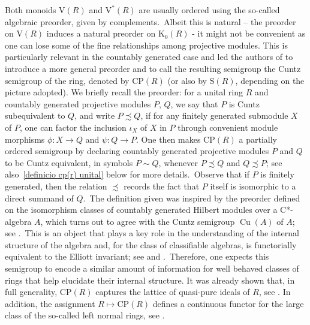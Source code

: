 \documentclass[11pt]{amsart}
\numberwithin{equation}{section}
\theoremstyle{definition}
\newcommand{\K}{\mathrm{K}}
\DeclareMathOperator{\Cu}{Cu}
\newcommand{\V}{\mathrm{V}}
\newcommand{\CP}{\mathrm{CP}}
\theoremstyle{plain}
\theoremstyle{definition}
\begin{document}
Both monoids $\V(R)$ and $\V^*(R)$ are usually ordered using the so-called algebraic preorder, given by complements.~Albeit this is natural -- the preorder on $\V(R)$ induces a natural preorder on $\K_0(R)$ - it might not be convenient as one can lose some of the fine relationships among projective modules. This is particularly relevant in the countably generated case and led the authors of \cite{AntAraBosPerVil25} to introduce a more general preorder and to call the resulting semigroup the Cuntz semigroup of the ring, denoted by $\CP(R)$ (or also by $\mathrm{S}(R)$, depending on the picture adopted). We briefly recall the preorder: for a unital ring $R$ and countably generated projective modules $P$, $Q$, we say that $P$ is Cuntz subequivalent to $Q$, and write $P\precsim Q$, if for any finitely generated submodule $X$ of $P$, one can factor the inclusion $\iota_X$ of $X$ in $P$ through convenient module morphisms $\phi\colon X\to Q$ and $\psi\colon Q\to P$. One then makes $\CP(R)$ a partially ordered semigroup by declaring countably generated projective modules $P$ and $Q$ to be Cuntz equivalent, in symbols $P\sim Q$, whenever $P\precsim Q$ and $Q\precsim P$; see also~\autoref{definicio cp(r) unital} below for more details.~Observe that if $P$ is finitely generated, then the relation $\precsim$ records the fact that $P$ itself is isomorphic to a direct summand of $Q$.~The definition given was inspired by the preorder defined on the isomorphism classes of countably generated Hilbert modules over a C*-algebra $A$, which turns out to agree with the Cuntz semigroup $\Cu(A)$ of $A$; see \cite{CowEllIva08CuInv}.~This is an object that plays a key role in the understanding of the internal structure of the algebra and, for the class of classifiable algebras, is functorially equivalent to the Elliott invariant; see \cite{AntDadPerSan14RecoverElliott} and \cite{AntPerRobThi22}.~Therefore, one expects this semigroup to encode a similar amount of information for well behaved classes of rings that help elucidate their internal structure. It was already shown that, in full generality, $\CP(R)$ captures the lattice of quasi-pure ideals of $R$, see \cite[Theorem 4.10]{AntAraBosPerVil26}.
In addition, the assignment $R\mapsto \CP(R)$ defines a continuous functor for the large class of the so-called left normal rings, see \cite[Theorem 8.2]{AntAraBosPerVil26}.
\end{document}
